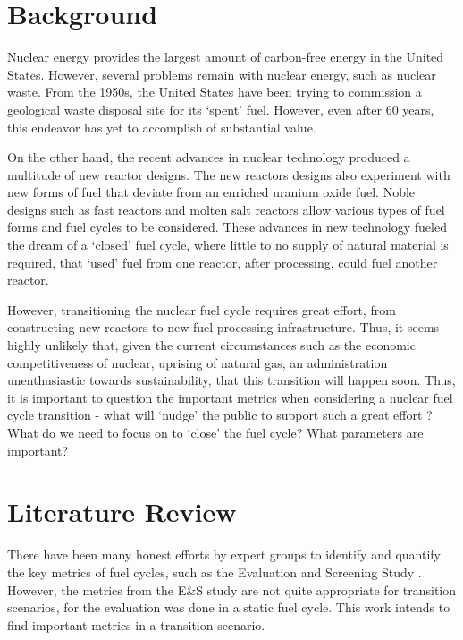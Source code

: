 \documentclass{article}
\begin{document}
\section{Background}
Nuclear energy provides the largest amount of carbon-free energy
in the United States. However, several problems remain with nuclear
energy, such as nuclear waste.
From the 1950s, the United States have been trying to commission a 
geological waste disposal site for its `spent' fuel. However, even
after 60 years, this endeavor has yet to accomplish of substantial value.

On the other hand, the recent advances in nuclear technology produced
a multitude of new reactor designs. The new reactors designs also
experiment with new forms of fuel that deviate from an enriched uranium
oxide fuel. Noble designs such as fast reactors and molten salt reactors
allow various types of fuel forms and fuel cycles to be considered. These advances in new
technology fueled the dream of a `closed' fuel cycle, where little to no
supply of natural material is required, that `used' fuel from one reactor,
after processing, could fuel another reactor.

However, transitioning the nuclear fuel cycle requires great effort,
from constructing new reactors to new fuel processing infrastructure.
Thus, it seems highly unlikely that, given the current circumstances
such as the economic competitiveness of nuclear, uprising of natural
gas, an administration unenthusiastic towards sustainability, that 
this transition will happen soon.
Thus, it is important to question the important metrics when considering
a nuclear fuel cycle transition - what will `nudge'\cite{leonard_richard_2008}
the public to support such a great effort ? What do we
need to focus on to `close' the fuel cycle? What parameters are
important?

\section{Literature Review}
There have been many honest efforts by expert groups
to identify and quantify the key metrics of fuel cycles,
 such as the Evaluation and Screening Study
\cite{wigeland_nuclear_2014}. However, the metrics from the E\&S study
are not quite appropriate for transition scenarios, for the evaluation
was done in a static fuel cycle. This work intends to find important
metrics in a transition scenario.
\end{document}
